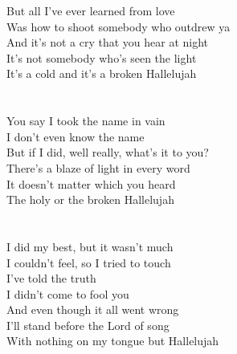 {{But all I've ever learned from love\\
Was how to shoot somebody who outdrew ya\\
And it's not a cry that you hear at night\\
It's not somebody who's seen the light\\
It's a cold and it's a broken Hallelujah}\\
\\\noindent\vbox{~\\
You say I took the name in vain\\
I don't even know the name\\
But if I did, well really, what's it to you?\\
There's a blaze of light in every word\\
It doesn't matter which you heard\\
The holy or the broken Hallelujah}\\
\\\noindent\vbox{~\\
I did my best, but it wasn't much\\
I couldn't feel, so I tried to touch\\
I've told the truth\\
I didn't come to fool you\\
And even though it all went wrong\\
I'll stand before the Lord of song\\
With nothing on my tongue but Hallelujah}
}





